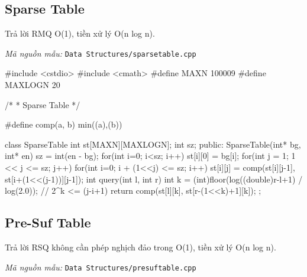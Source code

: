 \documentclass[11pt]{article}
\newcommand{\codepath}[1]{\par\noindent\textit{Mã nguồn mẫu:} \texttt{#1}\par}
\begin{document}
\subsection{Sparse Table}

Trả lời RMQ O(1), tiền xử lý O(n log n).

\codepath{Data Structures/sparsetable.cpp}

\begingroup\scriptsize
\begin{vncode}
#include <cstdio>
#include <cmath>
#define MAXN 100009
#define MAXLOGN 20

/*
 * Sparse Table
 */

#define comp(a, b) min((a),(b))

class SparseTable {
	int st[MAXN][MAXLOGN];
	int sz;
public:
	SparseTable(int* bg, int* en) {
		sz = int(en - bg);
		for(int i=0; i<sz; i++) st[i][0] = bg[i];
		for(int j = 1; 1 << j <= sz; j++)
			for(int i=0; i + (1<<j) <= sz; i++)
				st[i][j] = comp(st[i][j-1], st[i+(1<<(j-1))][j-1]);
	}
	int query(int l, int r) {
		int k = (int)floor(log((double)r-l+1) / log(2.0)); // 2^k <= (j-i+1)
		return comp(st[l][k], st[r-(1<<k)+1][k]);
	}
};
\end{vncode}
\endgroup


\subsection{Pre-Suf Table}

Trả lời RSQ không cần phép nghịch đảo trong O(1), tiền xử lý O(n log n).

\codepath{Data Structures/presuftable.cpp}
\end{document}
